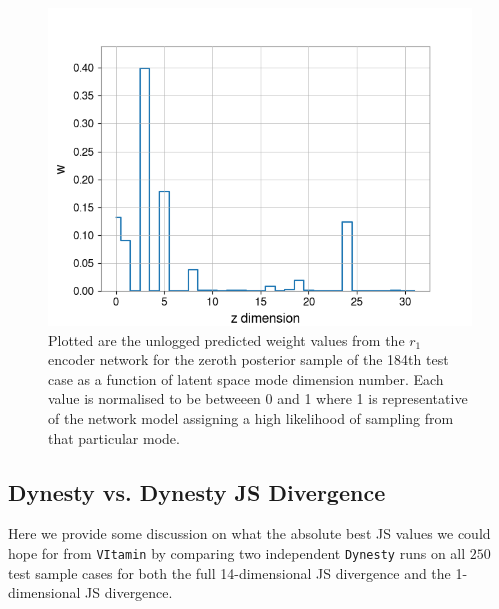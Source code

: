 %
%
\begin{figure}
    \includegraphics[width=\columnwidth]{figures/latent_weight_pub_plot_event_184.png}
    \caption[Latent space weight plot for the 184th test sample in the \texttt{VItamin} paper training set.]{\label{fig:log_weight_184} Plotted are the unlogged predicted weight values from the $r_1$ encoder network for the zeroth posterior sample of the 184th test case as a function of latent space mode dimension number. Each value is normalised to be betweeen 0 and 1 where 1 is representative of the network model assigning a high likelihood of sampling from that particular mode.}
\end{figure}


\subsection{Dynesty vs. Dynesty JS Divergence}\label{dyn_v_dyn_JS}

Here we provide some discussion on what the absolute best JS values we 
could hope for from \texttt{VItamin} by comparing two independent \texttt{Dynesty} 
runs on all $250$ test sample cases for both the full 14-dimensional JS 
divergence and the 1-dimensional \ac{JS} divergence. 

